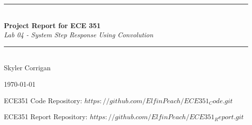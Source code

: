 \documentclass[12pt,a4paper]{article}
\newcommand{\HRule}{\rule{\linewidth}{0.5mm}}
\begin{document}
\begin{titlepage}
\begin{center}



\HRule \\[0.4cm]
{ \LARGE 
  \textbf{Project Report for ECE 351}\\[0.4cm]
  \emph{Lab 04 - System Step Response Using Convolution}\\[0.4cm]
}
\HRule \\[1.5cm]



{ \large
  Skyler Corrigan \\[0.1cm]
}

\vfill



{\large \today}

{ \large
ECE351 Code Repository: 
\hyperlink{$https://github.com/ElfinPeach/ECE351_Code.git$}{$https://github.com/ElfinPeach/ECE351_Code.git$}

ECE351 Report Repository: 
\hyperlink{$https://github.com/ElfinPeach/ECE351_Report.git$}{$https://github.com/ElfinPeach/ECE351_Report.git$}
}
 
\end{center}
\end{titlepage}


\newpage



\tableofcontents
{}
\newpage
\setcounter{page}{1}

\end{document}
